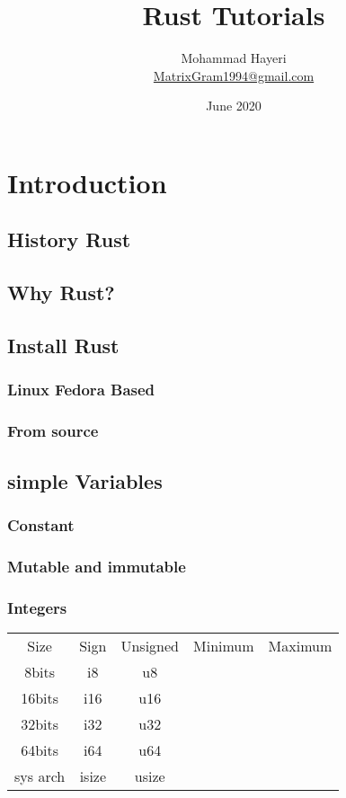 \documentclass{book}
\title{Rust Tutorials}
\author{Mohammad Hayeri\\\href{mailto:matrixgram1994@gmail.com}{MatrixGram1994@gmail.com}}
\date{June 2020}
\begin{document}
\maketitle
\chapter{Introduction}
\section{History Rust}
\section{Why Rust?}
\section{Install Rust}
\subsection{Linux Fedora Based}
\subsection{From source}
\section{simple Variables}
\subsection{Constant}
\subsection{Mutable and immutable}
\subsection{Integers}
\begin{center}
\begin{tabular}{|c c c c c|}
 \hline
 Size   & Sign  &   Unsigned & Minimum & Maximum\\
 8bits      &   i8  &   u8\\
 16bits     &   i16  &   u16\\
 32bits     &   i32  &   u32\\
 64bits     &   i64  &   u64\\
 sys arch   &   isize  &   usize\\
 \hline
\end{tabular}
\end{center}
\end{document}
